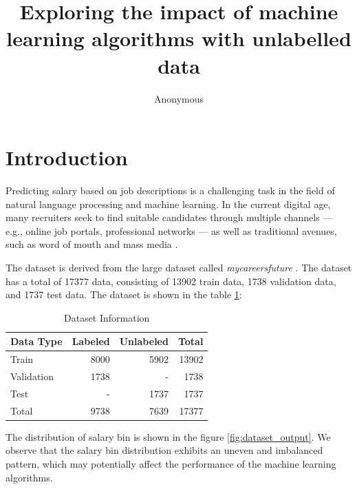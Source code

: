 \documentclass[11pt]{article}
\title{Exploring the impact of machine learning algorithms with unlabelled data}
\author
{Anonymous}
\begin{document}
\maketitle



\section{Introduction}
Predicting salary based on job descriptions is a challenging task in the field of natural language processing and machine learning.
In the current digital age, many recruiters seek to find suitable candidates through multiple channels 
— e.g., online job portals, professional networks 
— as well as traditional avenues, such as word of mouth and mass media \cite{Primary-Organizational-Recruitment-Sources}.

The dataset is derived from the large dataset called \textit{mycareersfuture} \cite{bhola-etal-2020-retrieving}.
The dataset has a total of 17377 data, consisting of 13902 train data, 1738 validation data, and 1737 test data. 
The dataset is shown in the table \ref{tab:dataset_info}:


\begin{table}[h]
    \centering
    \caption{Dataset Information}
    \begin{tabular}{lrrr}
        \toprule
        Data Type      & Labeled & Unlabeled & Total \\
        \midrule
        Train          & 8000    & 5902      & 13902 \\
        Validation     & 1738    & -         & 1738  \\
        Test           & -       & 1737      & 1737  \\
        \midrule
        Total          & 9738    & 7639      & 17377 \\
        \bottomrule
    \end{tabular}
    \label{tab:dataset_info}
\end{table}

The distribution of salary bin is shown in the figure \ref{fig:dataset_output}.
We observe that the salary bin distribution exhibits an uneven and imbalanced pattern,
which may potentially affect the performance of the machine learning algorithms.
\end{document}
